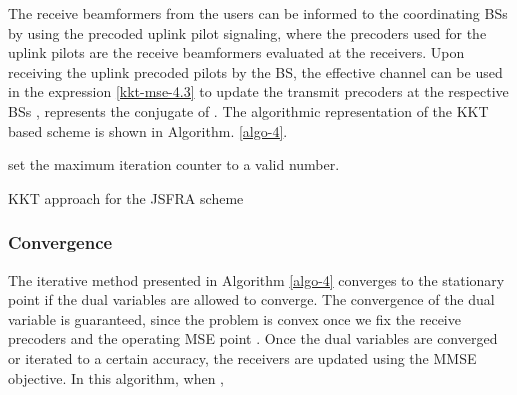 The receive beamformers from the users can be informed to the coordinating \acp{BS} by using the precoded uplink pilot signaling, where the precoders used for the uplink pilots are the receive beamformers  evaluated at the receivers. Upon receiving the uplink precoded pilots by the \ac{BS}, the effective channel  can be used in the expression \eqref{kkt-mse-4.3} to update the transmit precoders at the respective \acp{BS} \cite{komulainen2013effective},  represents the conjugate of . The algorithmic representation of the \ac{KKT} based scheme is shown in Algorithm. \ref{algo-4}.
\begin{algorithm}
 \SetAlgoLined
 \DontPrintSemicolon
 \BlankLine
 set the maximum iteration counter  to a valid number. \;
 \caption{\ac{KKT} approach for the \ac{JSFRA} scheme}
  \label{algo-4}
\end{algorithm}

\subsubsection*{Convergence}
The iterative method presented in Algorithm \ref{algo-4} converges to the stationary point if the dual variables  are allowed to converge. The convergence of the dual variable is guaranteed, since the problem is convex once we fix the receive precoders  and the operating \ac{MSE} point  \cite{boyd2011distributed}. Once the dual variables are converged or iterated to a certain accuracy, the receivers are updated using the \ac{MMSE} objective. In this algorithm, when , 
